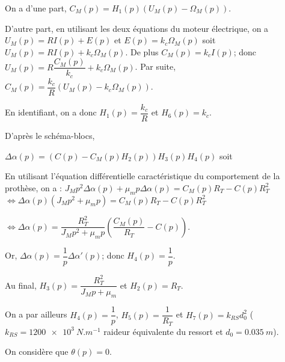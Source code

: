 \fi

\ifprof
\begin{corrige}
On a d'une part, $C_M(p)=H_1(p)\left(U_M(p)-\Omega_M(p)\right)$. 

D'autre part, en utilisant les deux équations du moteur électrique, on a $U_M (p)=RI (p)+E(p)$ et $E (p )=k_c \Omega_M (p)$ soit  $U_M (p)=RI (p)+k_c \Omega_M (p)$. De plus $C_M (p)=k_c I (p )$; donc $U_M (p)=R\dfrac{C_M(p)}{k_c}+k_c \Omega_M (p)$. 
Par suite, $C_M(p)=\dfrac{k_c}{R}\left(U_M (p)-k_c \Omega_M (p)\right)$.

En identifiant, on a donc $H_1(p)=\dfrac{k_c}{R}$ et  $H_6(p)={k_c}$.

D'après le schéma-blocs, 

$\Delta \alpha(p) = \left(C(p)-C_M(p)H_2(p)\right)H_3(p)H_4(p)$ soit 

En utilisant l'équation différentielle caractéristique du comportement de la prothèse, on a : 
$J_M p^2 \Delta \alpha(p) + \mu_m p \Delta \alpha(p)  = C_M(p)R_T -C(p)R_T^2$
$\Leftrightarrow \Delta \alpha(p) \left(J_M p^2  + \mu_m p \right)  = C_M(p)R_T -C(p)R_T^2$

$\Leftrightarrow \Delta \alpha(p)  = \dfrac{R_T^2}{J_M p^2  + \mu_m p}\left(\dfrac{C_M(p)}{R_T} -C(p)\right)$.

Or, $\Delta \alpha(p) = \dfrac{1}{p}\Delta \alpha'(p)$; donc $H_4(p)=\dfrac{1}{p}$.

Au final, $H_3(p) = \dfrac{R_T^2}{J_M p  + \mu_m }$ et $H_2(p)=R_T$.

\end{corrige}
\else
\fi

\ifprof
\else

On a par ailleurs $H_4(p)=\dfrac{1}{p}$, $H_5(p)=\dfrac{1}{R_T}$ et $H_7(p)=k_{RS}d_0^2$ ($k_{RS}=\SI{1200e3}{N.m^{-1}}$ raideur équivalente du ressort et $d_0=\SI{0,035}{m}$).

On considère que $\theta(p)=0$. 
\fi

